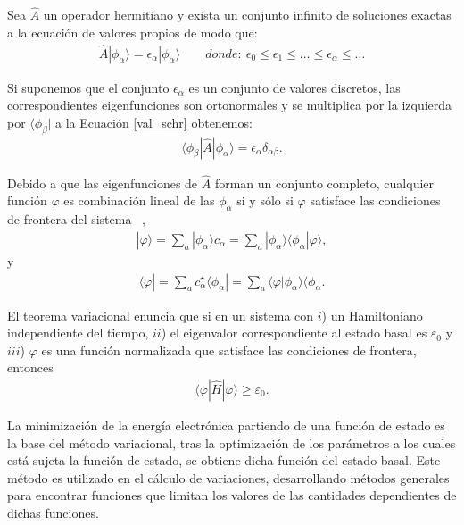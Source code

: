 Sea $\widehat{A}$ un operador hermitiano y exista un conjunto infinito de
soluciones exactas a la ecuación de valores propios de modo que:
%
\begin{align}
  \widehat{A}|\phi_{\alpha} \rangle = \epsilon_{\alpha}|\phi_{\alpha} \rangle \qquad donde:\ 
  \epsilon_{0} \le \epsilon_{1} \le \ldots \le \epsilon_{\alpha}
  \le \ldots
\label{val_schr}
\end{align}

Si suponemos que el conjunto ${\epsilon_{\alpha}}$ es un conjunto de valores
discretos, las correspondientes eigenfunciones son ortonormales y se multiplica
por la izquierda por $\langle\phi_{\beta}|$ a la Ecuación \ref{val_schr}
obtenemos:
%
\begin{align}
\langle\phi_{\beta} |\widehat{A} | \phi_{\alpha}\rangle = \epsilon_{\alpha}\delta_{\alpha\beta}.
\end{align}

Debido a que las eigenfunciones de $\widehat{A}$ forman un conjunto completo,
cualquier función $\varphi$ es combinación lineal de las $\phi_{\alpha}$ si y
sólo si $\varphi$ satisface las condiciones de frontera del sistema
~\cite{szabo},
%
\begin{align}
  |\varphi\rangle = \sum_{a}|\phi_{\alpha}\rangle c_{\alpha} = 
  \sum_{a}|\phi_{\alpha}\rangle\langle\phi_{\alpha} |\varphi\rangle,
\end{align}
\noindent y
\begin{align}
  \langle\varphi| = \sum_{a}c^{\star}_{\alpha} \langle\phi_{\alpha}|= 
  \sum_{a} \langle\varphi | \phi_{\alpha} \rangle \langle\phi_{\alpha}.
\end{align}

El teorema variacional enuncia que si en un sistema con $i$) un Hamiltoniano
independiente del tiempo, $ii$) el eigenvalor correspondiente al estado basal
es $\varepsilon_{0}$ y $iii$) $\varphi$ es una función normalizada que
satisface las condiciones de frontera, entonces
%
\begin{align}
\langle \varphi |\widehat{H}| \varphi \rangle \ge \varepsilon_{0}.
\end{align}

La minimización de la energía electrónica partiendo de una función de estado es
la base del método variacional, tras la optimización de los parámetros a los
cuales está sujeta la función de estado, se obtiene dicha función del estado
basal. Este método es utilizado en el cálculo de variaciones, desarrollando
métodos generales para encontrar funciones que limitan los valores de las
cantidades dependientes de dichas funciones.

